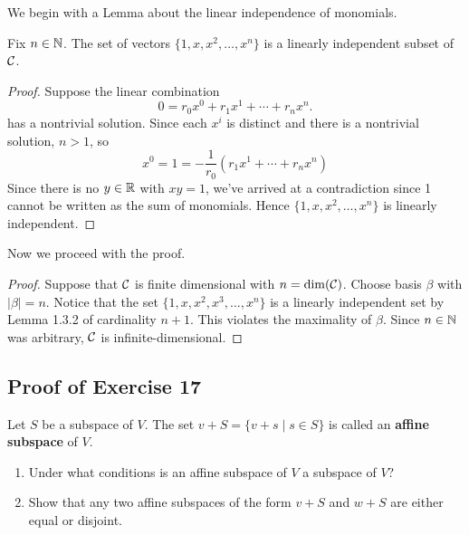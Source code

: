 We begin with a Lemma about the linear independence of monomials.

\begin{lemma}
Fix $n\in{\mathbb{N}}$. The set of vectors $\{1,x,x^2,\ldots,x^n\}$ is a linearly independent subset of ${\mathcal{C}}$. 
\end{lemma}

\begin{proof}
Suppose the linear combination
\[
	0 = r_0x^0 + r_1x^1 + \cdots + r_nx^n.
\]
has a nontrivial solution. Since each $x^i$ is distinct and there is a nontrivial solution, $n>1$, so
\[
	x^0 = 1 = -\frac{1}{r_0}\left(r_1x^1 + \cdots + r_nx^n\right)
\]
Since there is no $y\in{\mathbb{R}}$ with $xy = 1$, we've arrived at a contradiction since 1 cannot be written as the sum of monomials. Hence $\{1,x,x^2,\ldots,x^n\}$ is linearly independent.
\end{proof}

Now we proceed with the proof.

\begin{proof}
Suppose that ${\mathcal{C}}$ is finite dimensional with $n=\dim({\mathcal{C}})$. Choose basis $\beta$ with $|\beta| = n$. Notice that the set $\{1,x,x^2,x^3,\ldots,x^n\}$ is a linearly independent set by Lemma 1.3.2 of cardinality $n+1$. This violates the maximality of $\beta$. Since $n\in{\mathbb{N}}$ was arbitrary, ${\mathcal{C}}$ is infinite-dimensional. 
\end{proof}

\vfill
\pagebreak

\subsection{Proof of Exercise 17}
Let $S$ be a subspace of $V$. The set $v+S=\{v+s\mid s\in S\}$ is called an \textbf{affine subspace} of $V$.
\begin{enumerate}[label=\alph*)]
	\item Under what conditions is an affine subspace of $V$ a subspace of $V$?
	\item Show that any two affine subspaces of the form $v+S$ and $w+S$ are either equal or disjoint.
\end{enumerate}


